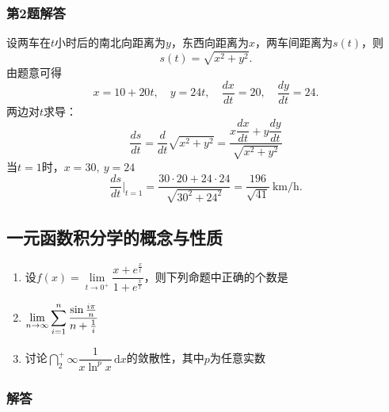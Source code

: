 \documentclass[./book.tex]{subfiles}
\begin{document}
    \subsubsection*{第2题解答}
    \begin{analysisbox}
        设两车在$t$小时后的南北向距离为$y$，东西向距离为$x$，两车间距离为$s(t)$，则
        \[
            s(t)=\sqrt{x^2+y^2}.
        \]
        由题意可得
        \[
            x=10+20t,\quad y=24t,\quad \frac{dx}{dt}=20,\quad \frac{dy}{dt}=24.
        \]
        两边对$t$求导：
        \[
            \frac{ds}{dt} = \frac{d}{dt}\sqrt{x^2 + y^2} = \frac{x\dfrac{dx}{dt} + y\dfrac{dy}{dt}}{\sqrt{x^2 + y^2}}
        \]
        当$t=1$时，$x = 30,\ y = 24$
        \[
            \frac{ds}{dt}\Big|_{t=1}
            =\frac{30\cdot 20+24\cdot 24}{\sqrt{30^2+24^2}}
            =\boxed{\frac{196}{\sqrt{41}}\ \text{km/h}}.
        \]
    \end{analysisbox}

    \subsection{一元函数积分学的概念与性质}

    \begin{enumerate}
        \item 设$f(x) = \lim\limits_{t\to 0^+} \dfrac{x + e^\frac{x}{t}}{1 + e^\frac{x}{t}}$，则下列命题中正确的个数是
        \item $\lim\limits_{n\to \infty} \displaystyle\sum_{i=1}^n \dfrac{\sin \frac{i\pi}{n}}{n + \frac{1}{i}}$
        \item 讨论$\dint_2^+\infty \dfrac{1}{x\ln^p x}\,\mathrm{d}x$的敛散性，其中$p$为任意实数
    \end{enumerate}

    \subsubsection{解答}

    \begin{enumerate}

    \end{enumerate}
\end{document}
